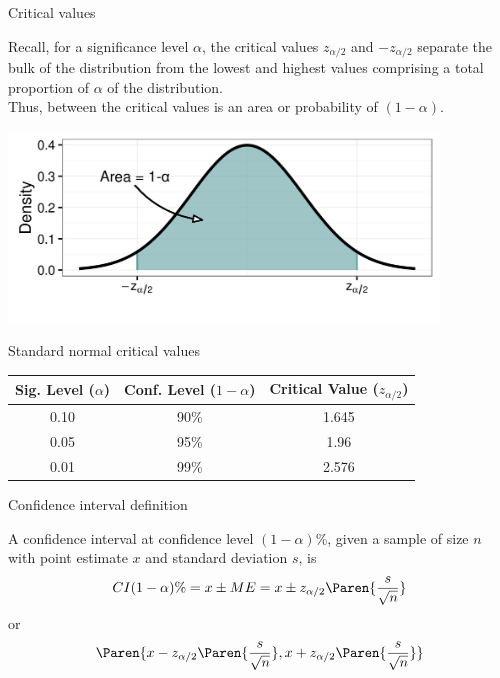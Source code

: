 \documentclass[xcolor=table]{beamer}
\begin{document}
\begin{frame}{Critical values}
\begin{block}{}
\large
Recall, for a significance level $\alpha$, the critical values $z_{\alpha/2}$ and $-z_{\alpha/2}$ separate the bulk of the distribution from the lowest and highest values comprising a total proportion of $\alpha$ of the distribution.\\
\medskip
Thus, between the critical values is an area or probability of $(1-\alpha)$. 
\end{block}
\medskip
{\centering
\includegraphics[width=4.5in]{../images/ch7_crit_values}
\par}
\end{frame}

\begin{frame}{Standard normal critical values}
\begin{block}{}
\large
{\centering
\begin{tabular}{c | c | c }
Sig. Level ($\alpha$) & Conf. Level ($1-\alpha$)  & Critical Value ($z_{\alpha/2}$)\\
\hline
0.10 & 90\% &  1.645\\
0.05 & 95\% & 1.96 \\
0.01 & 99\% & 2.576
\end{tabular}
\par}
\end{block}
\end{frame}

\begin{frame}{Confidence interval definition}

\begin{block}{}
\large
A confidence interval at confidence level $(1-\alpha)$\%, given a sample of size $n$ with point estimate $x$ and standard deviation $s$, is
\[CI (1-\alpha)\% = x \pm ME = x \pm z_{\alpha/2}\Paren{\frac s {\sqrt n}}\]
or
\[\Paren{x - z_{\alpha/2}\Paren{\frac s {\sqrt n}}, x + z_{\alpha/2}\Paren{\frac s {\sqrt n}} }\]
\end{block}

\end{frame}
\end{document}

